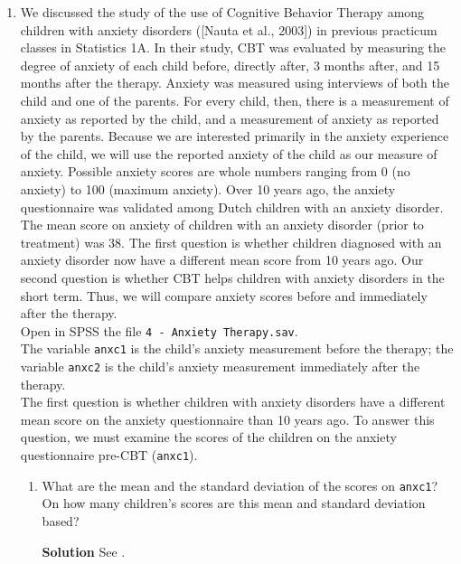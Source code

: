 \begin{enumerate}
    \item We discussed the study of the use of Cognitive Behavior Therapy among children with anxiety disorders ([Nauta et al., 2003]) in previous practicum classes in Statistics 1A. In their study, CBT was evaluated by measuring the degree of anxiety of each child before, directly after, 3 months after, and 15 months after the therapy. Anxiety was measured using interviews of both the child and one of the parents. For every child, then, there is a measurement of anxiety as reported by the child, and a measurement of anxiety as reported by the parents. Because we are interested primarily in the anxiety experience of the child, we will use the reported anxiety of the child as our measure of anxiety. Possible anxiety scores are whole numbers ranging from 0 (no anxiety) to 100 (maximum anxiety). Over 10 years ago, the anxiety questionnaire was validated among Dutch children with an anxiety disorder. The mean score on anxiety of children with an anxiety disorder (prior to treatment) was 38. The first question is whether children diagnosed with an anxiety disorder now have a different mean score from 10 years ago. Our second question is whether CBT helps children with anxiety disorders in the short term. Thus, we will compare anxiety scores before and immediately after the therapy. \\
    Open in SPSS the file \texttt{4 - Anxiety Therapy.sav}. \\
    The variable \texttt{anxc1} is the child’s anxiety measurement before the therapy; the variable \texttt{anxc2} is the child’s anxiety measurement immediately after the therapy. \\
    The first question is whether children with anxiety disorders have a different mean score on the anxiety questionnaire than 10 years ago. To answer this question, we must examine the scores of the children on the anxiety questionnaire pre-CBT (\texttt{anxc1}).
    \begin{enumerate}
        \item What are the mean and the standard deviation of the scores on \texttt{anxc1}? On how many children’s scores are this mean and standard deviation based?
        \begin{framed}{\textbf{Solution}}
        See .
        \end{framed}
        

\end{enumerate}
\end{enumerate}
